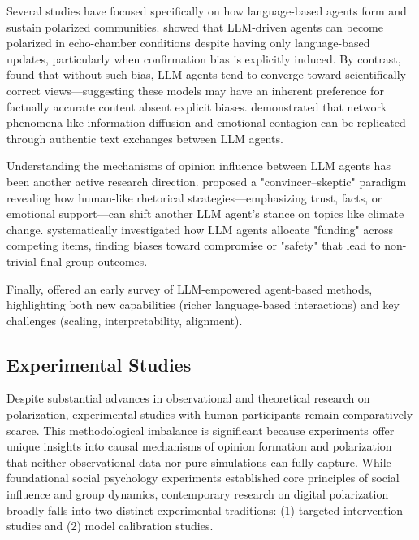 Several studies have focused specifically on how language-based agents form and sustain polarized communities. \citep{ohagi_polarization_2024} showed that LLM-driven agents can become polarized in echo-chamber conditions despite having only language-based updates, particularly when confirmation bias is explicitly induced. By contrast, \citep{chuang_simulating_2024} found that without such bias, LLM agents tend to converge toward scientifically correct views—suggesting these models may have an inherent preference for factually accurate content absent explicit biases. \citep{gao_social_2024} demonstrated that network phenomena like information diffusion and emotional contagion can be replicated through authentic text exchanges between LLM agents.

Understanding the mechanisms of opinion influence between LLM agents has been another active research direction. \citep{breum_persuasive_2024} proposed a "convincer–skeptic" paradigm revealing how human-like rhetorical strategies—emphasizing trust, facts, or emotional support—can shift another LLM agent's stance on topics like climate change. \citep{velarde_principles_2024} systematically investigated how LLM agents allocate "funding" across competing items, finding biases toward compromise or "safety" that lead to non-trivial final group outcomes.

Finally, \citep{gao_large_2024} offered an early survey of LLM-empowered agent-based methods, highlighting both new capabilities (richer language-based interactions) and key challenges (scaling, interpretability, alignment).

\subsection{Experimental Studies}

Despite substantial advances in observational and theoretical research on polarization, experimental studies with human participants remain comparatively scarce. This methodological imbalance is significant because experiments offer unique insights into causal mechanisms of opinion formation and polarization that neither observational data nor pure simulations can fully capture. While foundational social psychology experiments established core principles of social influence and group dynamics, contemporary research on digital polarization broadly falls into two distinct experimental traditions: (1) targeted intervention studies and (2) model calibration studies.


